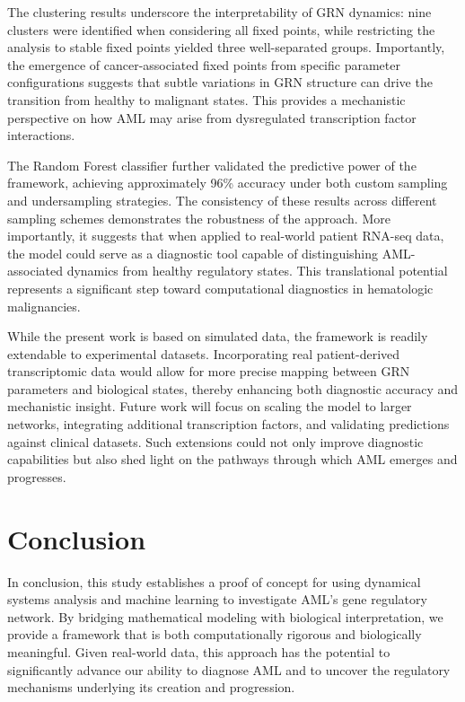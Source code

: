 \documentclass[a4paper,12pt]{article}
\begin{document}
The clustering results underscore the interpretability of GRN dynamics: nine clusters were identified when considering all fixed points, while restricting the analysis to stable fixed points yielded three well-separated groups. Importantly, the emergence of cancer-associated fixed points from specific parameter configurations suggests that subtle variations in GRN structure can drive the transition from healthy to malignant states. This provides a mechanistic perspective on how AML may arise from dysregulated transcription factor interactions.

The Random Forest classifier further validated the predictive power of the framework, achieving approximately 96\% accuracy under both custom sampling and undersampling strategies. The consistency of these results across different sampling schemes demonstrates the robustness of the approach. More importantly, it suggests that when applied to real-world patient RNA-seq data, the model could serve as a diagnostic tool capable of distinguishing AML-associated dynamics from healthy regulatory states. This translational potential represents a significant step toward computational diagnostics in hematologic malignancies.

While the present work is based on simulated data, the framework is readily extendable to experimental datasets. Incorporating real patient-derived transcriptomic data would allow for more precise mapping between GRN parameters and biological states, thereby enhancing both diagnostic accuracy and mechanistic insight. Future work will focus on scaling the model to larger networks, integrating additional transcription factors, and validating predictions against clinical datasets. Such extensions could not only improve diagnostic capabilities but also shed light on the pathways through which AML emerges and progresses.


\section{Conclusion}
In conclusion, this study establishes a proof of concept for using dynamical systems analysis and machine learning to investigate AML’s gene regulatory network. By bridging mathematical modeling with biological interpretation, we provide a framework that is both computationally rigorous and biologically meaningful. Given real-world data, this approach has the potential to significantly advance our ability to diagnose AML and to uncover the regulatory mechanisms underlying its creation and progression.
\end{document}

